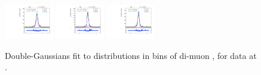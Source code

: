 \begin{figure}[htb]
\includegraphics[width=0.19\textwidth]{plots/Appendix_Recoil_Fits/ZmmData_PF_5TeV_2G_bkg/pfu2fit_32.pdf}
\includegraphics[width=0.19\textwidth]{plots/Appendix_Recoil_Fits/ZmmData_PF_5TeV_2G_bkg/pfu2fit_33.pdf}
\includegraphics[width=0.19\textwidth]{plots/Appendix_Recoil_Fits/ZmmData_PF_5TeV_2G_bkg/pfu2fit_34.pdf}
\caption{Double-Gaussians fit to \uprp distributions in bins of di-muon \pt, for \zmm data at \serag.}
\label{fig:a:recoil:fit:data:u2:5}
\end{figure}